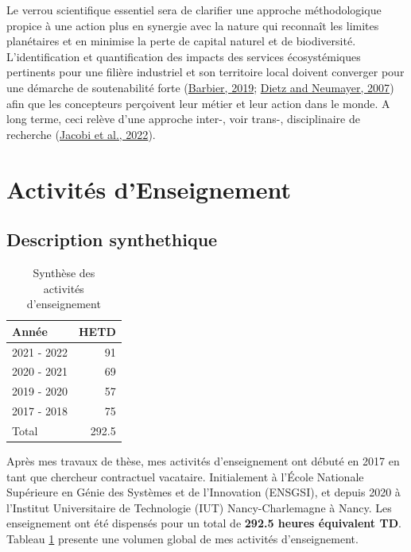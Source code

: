 \documentclass[
  11pt,
]{article}
\begin{document}
Le verrou scientifique essentiel sera de clarifier une approche
méthodologique propice à une action plus en synergie avec la nature qui
reconnaît les limites planétaires et en minimise la perte de capital
naturel et de biodiversité. L'identification et quantification des
impacts des services écosystémiques pertinents pour une filière
industriel et son territoire local doivent converger pour une démarche
de soutenabilité forte (\protect\hyperlink{ref-Barbier2019}{Barbier,
2019}; \protect\hyperlink{ref-Dietz2006}{Dietz and Neumayer, 2007}) afin
que les concepteurs perçoivent leur métier et leur action dans le monde.
A long terme, ceci relève d'une approche inter-, voir trans-,
disciplinaire de recherche (\protect\hyperlink{ref-Jacobi2022}{Jacobi et
al., 2022}).

\newpage

\hypertarget{activituxe9s-denseignement}{%
\section{Activités d'Enseignement}\label{activituxe9s-denseignement}}

\hypertarget{description-synthethique}{%
\subsection{Description synthethique}\label{description-synthethique}}

\begin{table}
   \caption{\label{tbl-heures}Synthèse des\\activités d'enseignement}
   \begin{tabular}[t]{lr}
   \toprule
   Année & HETD\\
   \midrule
   2021 - 2022 & 91\\
   2020 - 2021 & 69\\
   2019 - 2020 & 57\\
   2017 - 2018 & 75\\ \midrule
   Total & 292.5 \\
   \bottomrule
   \end{tabular}
\end{table}

Après mes travaux de thèse, mes activités d'enseignement ont débuté en
2017 en tant que chercheur contractuel vacataire. Initialement à l'École
Nationale Supérieure en Génie des Systèmes et de l'Innovation (ENSGSI),
et depuis 2020 à l'Institut Universitaire de Technologie (IUT)
Nancy-Charlemagne à Nancy. Les enseignement ont été dispensés pour un
total de \textbf{292.5 heures équivalent TD}. Tableau \ref{tbl-heures}
presente une volumen global de mes activités d'enseignement.
\end{document}
